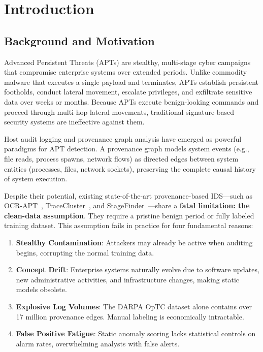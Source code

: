 \chapter{Introduction}
\label{ch:introduction}

\section{Background and Motivation}

Advanced Persistent Threats (APTs) are stealthy, multi-stage cyber campaigns that compromise
enterprise systems over extended periods. Unlike commodity malware that executes a single payload
and terminates, APTs establish persistent footholds, conduct lateral movement, escalate
privileges, and exfiltrate sensitive data over weeks or months. Because APTs execute
benign-looking commands and proceed through multi-hop lateral movements, traditional
signature-based security systems are ineffective against them.

Host audit logging and provenance graph analysis have emerged as powerful paradigms for APT
detection. A provenance graph models system events (e.g., file reads, process spawns, network
flows) as directed edges between system entities (processes, files, network sockets), preserving
the complete causal history of system execution.

Despite their potential, existing state-of-the-art provenance-based IDS---such as
OCR-APT~\cite{ocrapt2025}, TraceCluster~\cite{tracecluster2026}, and
StageFinder~\cite{stagefinder2026}---share a \textbf{fatal limitation: the clean-data
assumption}. They require a pristine benign period or fully labeled training dataset. This
assumption fails in practice for four fundamental reasons:

\begin{enumerate}[leftmargin=2cm]
\item \textbf{Stealthy Contamination}: Attackers may already be active when auditing begins,
    corrupting the normal training data.
\item \textbf{Concept Drift}: Enterprise systems naturally evolve due to software updates,
    new administrative activities, and infrastructure changes, making static models obsolete.
\item \textbf{Explosive Log Volumes}: The DARPA OpTC dataset alone contains over 17 million
    provenance edges. Manual labeling is economically intractable.
\item \textbf{False Positive Fatigue}: Static anomaly scoring lacks statistical controls on
    alarm rates, overwhelming analysts with false alerts.
\end{enumerate}

